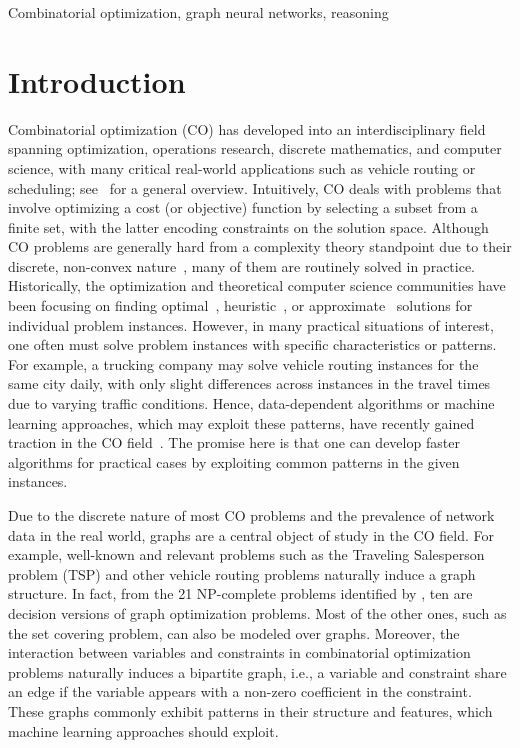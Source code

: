 \documentclass[twoside,11pt]{article}
\newcommand{\al}[1]{{{\textcolor{magenta}{\textbf{[AL:} {#1}\textbf{]}}}}}
\newcommand{\cm}[1]{{{\textcolor{orange}{\textbf{[CM:} {#1}\textbf{]}}}}}
\begin{document}
\begin{keywords}
    Combinatorial optimization, graph neural networks, reasoning
\end{keywords}

\section{Introduction}

Combinatorial optimization (CO) has developed into an interdisciplinary field spanning optimization, operations research, discrete mathematics, and computer science, with many critical real-world applications such as vehicle routing or scheduling; see~\citep{Kor+2012} for a general overview. Intuitively, CO deals with problems that involve optimizing a cost (or objective) function by selecting a subset from a finite set, with the latter encoding constraints on the solution space. Although CO problems are generally hard from a complexity theory standpoint due to their discrete, non-convex nature~\citep{karp1972reducibility},
many of them are routinely solved in practice. Historically, the optimization and theoretical computer science communities have been focusing on finding optimal~\citep{Kor+2012}, heuristic~\citep{boussaid2013survey}, or approximate~\citep{Vaz+2010} solutions for individual problem instances. However, in many practical situations of interest, one often must solve problem instances with specific characteristics or patterns. For example, a trucking company may solve vehicle routing instances for the same city daily, with only slight differences across instances in the travel times due to varying traffic conditions. Hence, data-dependent algorithms or machine learning approaches, which may exploit these patterns, have recently gained traction in the CO field~\citep{Bengio2018,ML4CO}. The promise here is that one can develop faster algorithms for practical cases by exploiting common patterns in the given instances.

Due to the discrete nature of most CO problems and the prevalence of network data in the real world, graphs are a central object of study in the CO field. For example, well-known and relevant problems such as the Traveling Salesperson problem (TSP) and other vehicle routing problems naturally induce a graph structure. In fact, from the 21 \textsf{NP}-complete problems identified by \citet{karp1972reducibility}, ten are decision versions of graph optimization problems.  Most of the other ones, such as the set covering problem, can also be modeled over graphs. Moreover, the interaction between variables and constraints in combinatorial optimization problems naturally induces a bipartite graph, i.e., a variable and constraint share an edge if the variable appears with a non-zero coefficient in the constraint. These graphs commonly exhibit patterns in their structure and features, which machine learning approaches should exploit.
\end{document}
